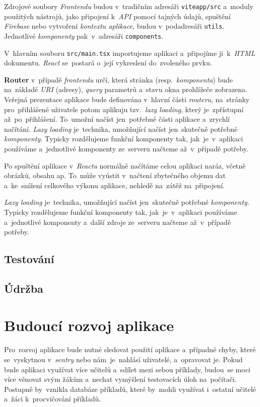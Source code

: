 \documentclass[10pt,a4paper]{article}
\begin{document}
            Zdrojové soubory \emph{Frontendu} budou v~tradičním adresáři \texttt{viteapp/src} a~moduly použitých nástrojů, jako připojení k~\emph{API} pomocí tajných údajů, spuštění \emph{Firebase} nebo vytvoření \emph{kontextu aplikace}, budou v~podadresáři \texttt{utils}. Jednotlivé \emph{komponenty} pak~v~adresáři \texttt{components}.

            V~hlavním souboru \texttt{src/main.tsx} importujeme aplikaci a~připojíme ji~k~\emph{HTML} dokumentu. \emph{React} se~postará o~její vykreslení do~zvoleného prvku.

            \textbf{Router} v~případě \emph{frontendu} určí, která stránka (resp.~\emph{komponenta}) bude na~základě \emph{URI} (adresy), \emph{query} parametrů a~stavu okna prohlížeče zobrazena. Veřejná prezentace aplikace bude definována v~hlavní části \emph{routeru}, na~stránky pro~přihlášené uživatele potom aplikuju tzv.~\emph{lazy loading}, který je~zpřístupní až~po~přihlášení. To~umožní načíst jen~potřebné části aplikace a~zrychlí načítání. \emph{Lazy loading} je~technika, umožňující načíst jen~skutečně potřebné \emph{komponenty}. Typicky rozdělujeme funkční komponenty tak, jak~je~v~aplikaci používáme a~jednotlivé komponenty ze~serveru načteme až~v~případě potřeby. \cite{lazyload}

            Po spuštění aplikace v~\emph{Reactu} normálně načítáme celou aplikaci naráz, včetně obrázků, obsahu ap. To~může vyústit v~načtení zbytečného objemu dat a~ke~snížení celkového výkonu aplikace, nehledě na~zátěž na~připojení.

            \emph{Lazy loading} je~technika, umožňující načíst jen~skutečně potřebné \emph{komponenty}. Typicky rozdělujeme funkční komponenty tak, jak~je~v~aplikaci používáme a~jednotlivé komponenty a~další zdroje ze~serveru načteme až~v~případě potřeby. \cite{lazyload}

        \subsection{Testování}
        \subsection{Údržba}
        
	\section{Budoucí rozvoj aplikace}
        Pro~rozvoj aplikace bude nutné sledovat použití aplikace a~případné chyby, které se~vyskytnou v~\emph{sentry} nebo nám~je~nahlásí uživatelé, a~opravovat je.
        Pokud bude aplikaci využívat více učitelů a~sdílet mezi sebou příklady, budou~se moci více věnovat svým žákům a~nechat vymýšlení testovacích úloh na~počítači. Postupně by~vznikla databáze příkladů, které by~mohli využívat i~ostatní učitelé a~žáci k~procvičování příkladů.
        
\end{document}
